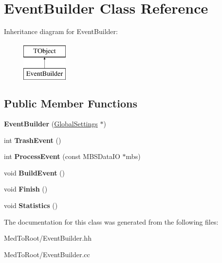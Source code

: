 \hypertarget{class_event_builder}{}\section{Event\+Builder Class Reference}
\label{class_event_builder}
Inheritance diagram for Event\+Builder\+:\begin{figure}[H]
\begin{center}
\leavevmode
\includegraphics[height=2.000000cm]{class_event_builder}
\end{center}
\end{figure}
\subsection*{Public Member Functions}
\begin{DoxyCompactItemize}
\item 
\mbox{\label{class_event_builder_ae5bc6281c66e115f92ab1aad525cc71b}} 
{\bfseries Event\+Builder} (\hyperlink{class_global_settings}{Global\+Settings} $\ast$)
\item 
\mbox{\label{class_event_builder_a19d233a535cc211f91f5de56f4c42e9c}} 
int {\bfseries Trash\+Event} ()
\item 
\mbox{\label{class_event_builder_a4e469463e20974bc7be2cfa0ab3874f5}} 
int {\bfseries Process\+Event} (const M\+B\+S\+Data\+IO $\ast$mbs)
\item 
\mbox{\label{class_event_builder_a5e3732d9c2aa0539c0e01e22ce7f5c88}} 
void {\bfseries Build\+Event} ()
\item 
\mbox{\label{class_event_builder_abcc24c43c7bcca0c9e445141349fd816}} 
void {\bfseries Finish} ()
\item 
\mbox{\label{class_event_builder_a840f7a4c8d9bb81e92007cfb19637bff}} 
void {\bfseries Statistics} ()
\end{DoxyCompactItemize}


The documentation for this class was generated from the following files\+:\begin{DoxyCompactItemize}
\item 
Med\+To\+Root/Event\+Builder.\+hh\item 
Med\+To\+Root/Event\+Builder.\+cc\end{DoxyCompactItemize}
